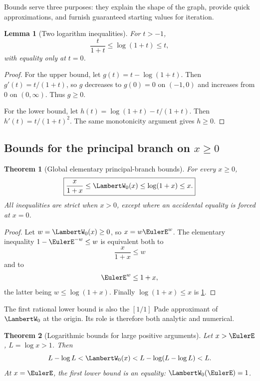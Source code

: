 \documentclass[11pt]{article}
\newtheorem{theorem}{Theorem}[section]
\newtheorem{lemma}[lemma]{Lemma}
\theoremstyle{remark}
\newcommand{\Wz}{\LambertW_{0}}
\begin{document}
Bounds serve three purposes: they explain the shape of the graph, provide
quick approximations, and furnish guaranteed starting values for iteration.

\begin{lemma}[Two logarithm inequalities]\label{lem:logineq}
For \(t>-1\),
\begin{equation}\label{eq:logineq}
       \frac{t}{1+t}\leq\log(1+t)\leq t,
\end{equation}
with equality only at \(t=0\).
\end{lemma}

\begin{proof}
For the upper bound, let \(g(t)=t-\log(1+t)\).  Then
\(g'(t)=t/(1+t)\), so \(g\) decreases to \(g(0)=0\) on \((-1,0)\) and
increases from \(0\) on \((0,\infty)\).  Thus \(g\geq0\).

For the lower bound, let
\(h(t)=\log(1+t)-t/(1+t)\).  Then
\(h'(t)=t/(1+t)^2\).  The same monotonicity argument gives \(h\geq0\).
\end{proof}

\subsection{Bounds for the principal branch on \texorpdfstring{\(x\geq0\)}{x >= 0}}

\begin{theorem}[Global elementary principal-branch bounds]\label{thm:W0positivebounds}
For every \(x\geq0\),
\begin{equation}\label{eq:W0positivebounds}
 \boxed{\displaystyle
 \frac{x}{1+x}\leq\Wz(x)\leq\log(1+x)\leq x.}
\end{equation}
All inequalities are strict when \(x>0\), except where an accidental equality
is forced at \(x=0\).
\end{theorem}

\begin{proof}
Let \(w=\Wz(x)\geq0\), so \(x=w\EulerE^w\).  The elementary inequality
\(1-\EulerE^{-w}\leq w\) is equivalent both to
\[
       \frac{x}{1+x}\leq w
\]
and to
\[
       \EulerE^w\leq1+x,
\]
the latter being \(w\leq\log(1+x)\).  Finally
\(\log(1+x)\leq x\) is \cref{lem:logineq}.
\end{proof}

The first rational lower bound is also the \([1/1]\) Pade approximant of
\(\Wz\) at the origin.  Its role is therefore both analytic and numerical.

\begin{theorem}[Logarithmic bounds for large positive arguments]\label{thm:W0logbounds}
Let \(x>\EulerE\), \(L=\log x>1\).  Then
\begin{equation}\label{eq:W0logbounds}
 L-\log L
 <\Wz(x)
 <L-\log(L-\log L)
 <L.
\end{equation}
At \(x=\EulerE\), the first lower bound is an equality:
\(\Wz(\EulerE)=1\).
\end{theorem}
\end{document}
